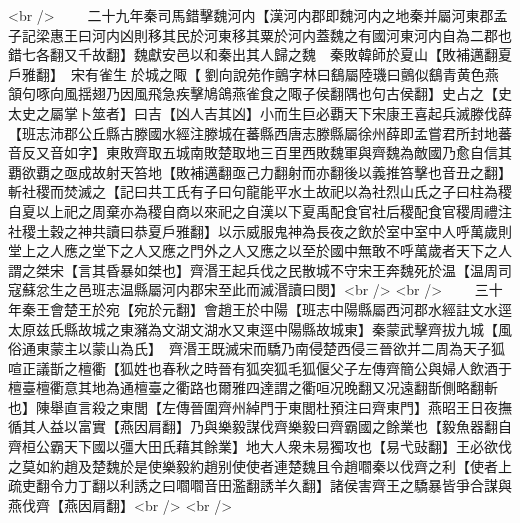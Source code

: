 <br />
　　二十九年秦司馬錯擊魏河内【漢河内郡即魏河内之地秦并屬河東郡孟子記梁惠王曰河内凶則移其民於河東移其粟於河内蓋魏之有國河東河内自為二郡也錯七各翻又千故翻】魏獻安邑以和秦出其人歸之魏　秦敗韓師於夏山【敗補邁翻夏戶雅翻】　宋有雀生於城之陬【劉向說苑作鸇字林曰鷂屬陸璣曰鸇似鷂青黄色燕頷句啄向風揺翅乃因風飛急疾擊鳩鴿燕雀食之陬子侯翻隅也句古侯翻】史占之【史太史之屬掌卜筮者】曰吉【凶人吉其凶】小而生巨必覇天下宋康王喜起兵滅滕伐薛【班志沛郡公丘縣古滕國水經注滕城在蕃縣西唐志滕縣屬徐州薛即孟嘗君所封地蕃音反又音如字】東敗齊取五城南敗楚取地三百里西敗魏軍與齊魏為敵國乃愈自信其覇欲覇之亟成故射天笞地【敗補邁翻亟己力翻射而亦翻後以義推笞擊也音丑之翻】斬社稷而焚滅之【記曰共工氏有子曰句龍能平水土故祀以為社烈山氏之子曰柱為稷自夏以上祀之周棄亦為稷自商以來祀之自漢以下夏禹配食官社后稷配食官稷周禮注社稷土穀之神共讀曰恭夏戶雅翻】以示威服鬼神為長夜之飲於室中室中人呼萬歲則堂上之人應之堂下之人又應之門外之人又應之以至於國中無敢不呼萬歲者天下之人謂之桀宋【言其昏暴如桀也】齊湣王起兵伐之民散城不守宋王奔魏死於温【温周司寇蘇忿生之邑班志温縣屬河内郡宋至此而滅湣讀曰閔】<br />
<br />
　　三十年秦王會楚王於宛【宛於元翻】會趙王於中陽【班志中陽縣屬西河郡水經註文水逕太原兹氏縣故城之東瀦為文湖文湖水又東逕中陽縣故城東】秦蒙武擊齊拔九城【風俗通東蒙主以蒙山為氏】　齊湣王既滅宋而驕乃南侵楚西侵三晉欲并二周為天子狐喧正議斮之檀衢【狐姓也春秋之時晉有狐突狐毛狐偃父子左傳齊簡公與婦人飲酒于檀臺檀衢意其地為通檀臺之衢路也爾雅四達謂之衢咺况晚翻又况遠翻斮側略翻斬也】陳舉直言殺之東閭【左傳晉圍齊州綽門于東閭杜預注曰齊東門】燕昭王日夜撫循其人益以富實【燕因肩翻】乃與樂毅謀伐齊樂毅曰齊霸國之餘業也【毅魚器翻自齊桓公霸天下國以彊大田氏藉其餘業】地大人衆未易獨攻也【易弋䜴翻】王必欲伐之莫如約趙及楚魏於是使樂毅約趙别使使者連楚魏且令趙嚪秦以伐齊之利【使者上疏吏翻令力丁翻以利誘之曰嚪嚪音田濫翻誘羊久翻】諸侯害齊王之驕暴皆爭合謀與燕伐齊【燕因肩翻】<br />
<br />
